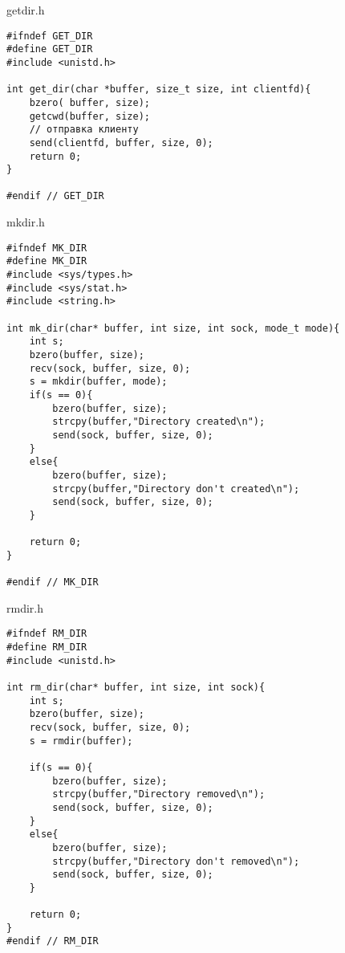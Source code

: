 \documentclass[12pt,a4paper]{report}
\begin{document}
getdir.h
\begin{lstlisting}
#ifndef GET_DIR
#define GET_DIR
#include <unistd.h>

int get_dir(char *buffer, size_t size, int clientfd){
    bzero( buffer, size);
    getcwd(buffer, size);
    // отправка клиенту
    send(clientfd, buffer, size, 0);
    return 0;
}

#endif // GET_DIR
\end{lstlisting}

mkdir.h
\begin{lstlisting}
#ifndef MK_DIR
#define MK_DIR
#include <sys/types.h>
#include <sys/stat.h>
#include <string.h>

int mk_dir(char* buffer, int size, int sock, mode_t mode){
    int s;
    bzero(buffer, size);
    recv(sock, buffer, size, 0);
    s = mkdir(buffer, mode);
    if(s == 0){
        bzero(buffer, size);
        strcpy(buffer,"Directory created\n");
        send(sock, buffer, size, 0);
    }
    else{
        bzero(buffer, size);
        strcpy(buffer,"Directory don't created\n");
        send(sock, buffer, size, 0);
    }

    return 0;
}

#endif // MK_DIR
\end{lstlisting}

rmdir.h
\begin{lstlisting}
#ifndef RM_DIR
#define RM_DIR
#include <unistd.h>

int rm_dir(char* buffer, int size, int sock){
    int s;
    bzero(buffer, size);
    recv(sock, buffer, size, 0);
    s = rmdir(buffer);

    if(s == 0){
        bzero(buffer, size);
        strcpy(buffer,"Directory removed\n");
        send(sock, buffer, size, 0);
    }
    else{
        bzero(buffer, size);
        strcpy(buffer,"Directory don't removed\n");
        send(sock, buffer, size, 0);
    }

    return 0;
}
#endif // RM_DIR
\end{lstlisting}
\end{document}
